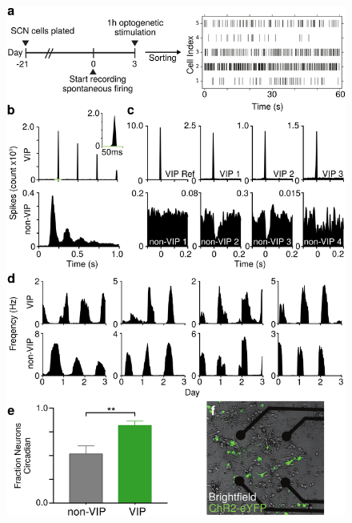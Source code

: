 \begin{figure}[p]
    \begin{center}
        \includegraphics[width=4.5in]{chap5/figures/Figure1.png}
    \end{center}
\end{figure}
\clearpage
